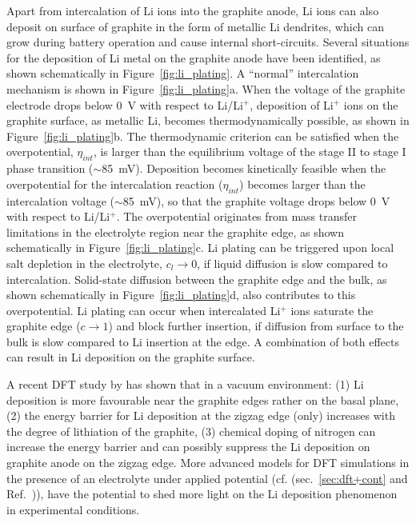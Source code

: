 \documentclass[../main.tex]{subfiles}
\begin{document}
Apart from intercalation of Li ions into the graphite anode, Li ions can also deposit on surface of graphite in the form of metallic Li dendrites, which can grow during battery operation and cause internal short-circuits. Several situations for the deposition of Li metal on the graphite anode have been identified, as shown schematically in Figure~\ref{fig:li_plating}.\cite{Gao2021} A ``normal'' intercalation mechanism is shown in Figure~\ref{fig:li_plating}a. When the voltage of the graphite electrode drops below 0~V with respect to Li/Li$^+$, deposition of Li$^+$ ions on the graphite surface, as metallic Li, becomes thermodynamically possible, as shown in Figure~\ref{fig:li_plating}b. The thermodynamic criterion can be satisfied when the overpotential, $\eta_{int}$, is larger than the equilibrium voltage of the stage II to stage I phase transition ($\sim$85~mV). Deposition becomes kinetically feasible when the overpotential for the intercalation reaction ($\eta_{int}$) becomes larger than the intercalation voltage ($\sim$85~mV), so that the graphite voltage drops below 0~V with respect to Li/Li$^+$. The overpotential originates from mass transfer limitations in the electrolyte region near the graphite edge, as shown schematically in Figure~\ref{fig:li_plating}c. Li plating can be triggered upon local salt depletion in the electrolyte, $c_l\rightarrow 0$, if liquid diffusion is slow compared to intercalation. Solid-state diffusion between the graphite edge and the bulk, as shown schematically in Figure~\ref{fig:li_plating}d, also contributes to this overpotential.  Li plating can occur when intercalated Li$^+$ ions saturate the graphite edge ($c\rightarrow1$) and block further insertion, if diffusion from surface to the bulk is slow compared to Li insertion at the edge. A combination of both effects can result in Li deposition on the graphite surface.

A recent DFT study by \citeauthor{peng2021} has shown that in a vacuum environment: (1) Li deposition is more favourable near the graphite edges rather on the basal plane, (2) the energy barrier for Li deposition at the zigzag edge (only) increases with the degree of lithiation of the graphite, (3) chemical doping of nitrogen can increase the energy barrier and can possibly suppress the Li deposition on graphite anode on the zigzag edge.\cite{peng2021} More advanced models for DFT simulations in the presence of an electrolyte under applied potential (cf. (sec.~\ref{sec:dft+cont} and Ref.~)), have the potential to shed more light on the Li deposition phenomenon in experimental conditions.
\end{document}

